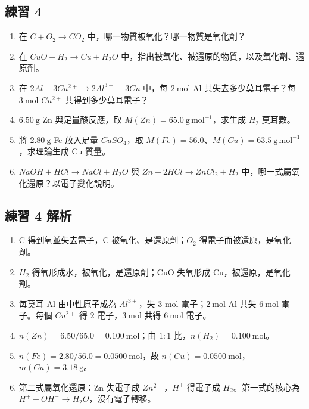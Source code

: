\documentclass[11pt,a4paper]{article}
\providecommand{\tightlist}{%
  \setlength{\itemsep}{0pt}\setlength{\parskip}{0pt}}
\begin{document}
\subsection{練習 4}\label{ux7df4ux7fd2-4}

\begin{enumerate}
\def\labelenumi{\arabic{enumi}.}
\tightlist
\item
  在 \(C+O_2\rightarrow CO_2\) 中，哪一物質被氧化？哪一物質是氧化劑？
\item
  在 \(CuO+H_2\rightarrow Cu+H_2O\) 中，指出被氧化、被還原的物質，以及氧化劑、還原劑。
\item
  在 \(2Al+3Cu^{2+}\rightarrow2Al^{3+}+3Cu\) 中，每 \(2\ \mathrm{mol}\) Al 共失去多少莫耳電子？每 \(3\ \mathrm{mol}\) \(Cu^{2+}\) 共得到多少莫耳電子？
\item
  \(6.50\ \mathrm g\) Zn 與足量酸反應，取 \(M(Zn)=65.0\ \mathrm{g\,mol^{-1}}\)，求生成 \(H_2\) 莫耳數。
\item
  將 \(2.80\ \mathrm g\) Fe 放入足量 \(CuSO_4\)，取 \(M(Fe)=56.0\)、\(M(Cu)=63.5\ \mathrm{g\,mol^{-1}}\)，求理論生成 Cu 質量。
\item
  \(NaOH+HCl\rightarrow NaCl+H_2O\) 與 \(Zn+2HCl\rightarrow ZnCl_2+H_2\) 中，哪一式屬氧化還原？以電子變化說明。
\end{enumerate}

\subsection{練習 4 解析}\label{ux7df4ux7fd2-4-ux89e3ux6790}

\begin{enumerate}
\def\labelenumi{\arabic{enumi}.}
\tightlist
\item
  C 得到氧並失去電子，C 被氧化、是還原劑；\(O_2\) 得電子而被還原，是氧化劑。
\item
  \(H_2\) 得氧形成水，被氧化，是還原劑；CuO 失氧形成 Cu，被還原，是氧化劑。
\item
  每莫耳 Al 由中性原子成為 \(Al^{3+}\)，失 3 mol 電子；\(2\ \mathrm{mol}\) Al 共失 \(6\ \mathrm{mol}\) 電子。每個 \(Cu^{2+}\) 得 2 電子，\(3\ \mathrm{mol}\) 共得 \(6\ \mathrm{mol}\) 電子。
\item
  \(n(Zn)=6.50/65.0=0.100\ \mathrm{mol}\)；由 \(1:1\) 比，\(n(H_2)=0.100\ \mathrm{mol}\)。
\item
  \(n(Fe)=2.80/56.0=0.0500\ \mathrm{mol}\)，故 \(n(Cu)=0.0500\ \mathrm{mol}\)，\(m(Cu)=3.18\ \mathrm g\)。
\item
  第二式屬氧化還原：Zn 失電子成 \(Zn^{2+}\)，\(H^+\) 得電子成 \(H_2\)。第一式的核心為 \(H^++OH^-\rightarrow H_2O\)，沒有電子轉移。
\end{enumerate}
\end{document}
